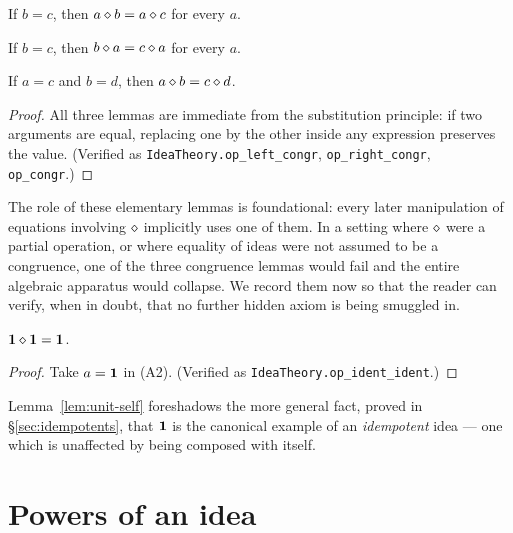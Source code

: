 \begin{lemma}\label{lem:left-cong}
If $b = c$, then $a \mathbin{\diamond} b = a \mathbin{\diamond} c$ for every $a$.
\end{lemma}

\begin{lemma}\label{lem:right-cong}
If $b = c$, then $b \mathbin{\diamond} a = c \mathbin{\diamond} a$ for every $a$.
\end{lemma}

\begin{lemma}\label{lem:bilin-cong}
If $a = c$ and $b = d$, then $a \mathbin{\diamond} b = c \mathbin{\diamond} d$.
\end{lemma}

\begin{proof}
All three lemmas are immediate from the substitution principle: if two
arguments are equal, replacing one by the other inside any expression
preserves the value.  (Verified as \texttt{IdeaTheory.op\_left\_congr},
\texttt{op\_right\_congr}, \texttt{op\_congr}.)
\end{proof}

The role of these elementary lemmas is foundational: every later
manipulation of equations involving $\mathbin{\diamond}$ implicitly uses one of
them.  In a setting where $\mathbin{\diamond}$ were a partial operation, or where
equality of ideas were not assumed to be a congruence, one of the three
congruence lemmas would fail and the entire algebraic apparatus would
collapse.  We record them now so that the reader can verify, when in
doubt, that no further hidden axiom is being smuggled in.

\begin{lemma}\label{lem:unit-self}
$\mathbf{1} \mathbin{\diamond} \mathbf{1} = \mathbf{1}$.
\end{lemma}

\begin{proof}
Take $a = \mathbf{1}$ in (A2).  (Verified as
\texttt{IdeaTheory.op\_ident\_ident}.)
\end{proof}

Lemma~\ref{lem:unit-self} foreshadows the more general fact, proved in
\S\ref{sec:idempotents}, that $\mathbf{1}$ is the canonical example of an
\emph{idempotent} idea --- one which is unaffected by being composed with
itself.

\section{Powers of an idea}\label{sec:powers}

